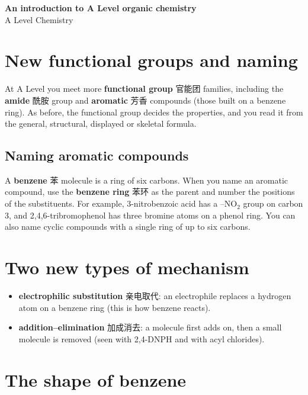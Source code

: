 \documentclass[11pt]{article}
\begin{document}
\begin{center}
  {\LARGE\bfseries An introduction to A Level organic chemistry}\\[0.35em]
  {\large A Level Chemistry}
\end{center}
\vspace{0.6em}

\section*{New functional groups and naming}

At A Level you meet more \textbf{functional group} 官能团 families, including the \textbf{amide} 酰胺 group and \textbf{aromatic} 芳香 compounds (those built on a benzene ring). As before, the functional group decides the properties, and you read it from the general, structural, displayed or skeletal formula.

\subsection*{Naming aromatic compounds}

A \textbf{benzene} 苯 molecule is a ring of six carbons. When you name an aromatic compound, use the \textbf{benzene ring} 苯环 as the parent and number the positions of the substituents. For example, 3-nitrobenzoic acid has a $\text{–NO}_2$ group on carbon 3, and 2,4,6-tribromophenol has three bromine atoms on a phenol ring. You can also name cyclic compounds with a single ring of up to six carbons.

\section*{Two new types of mechanism}

\begin{itemize}
\item \textbf{electrophilic substitution} 亲电取代: an electrophile replaces a hydrogen atom on a benzene ring (this is how benzene reacts).

\item \textbf{addition–elimination} 加成消去: a molecule first adds on, then a small molecule is removed (seen with 2,4-DNPH and with acyl chlorides).

\end{itemize}

\section*{The shape of benzene}
\end{document}
